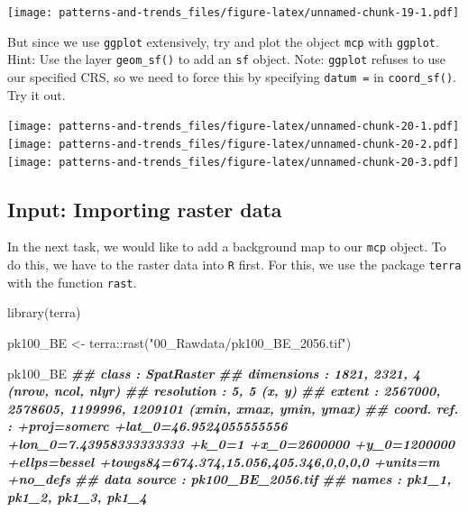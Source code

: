 \documentclass[
]{book}
\newenvironment{Shaded}{\begin{snugshade}}{\end{snugshade}}
\newcommand{\DocumentationTok}[1]{\textcolor[rgb]{0.56,0.35,0.01}{\textbf{\textit{#1}}}}
\newcommand{\FunctionTok}[1]{\textcolor[rgb]{0.00,0.00,0.00}{#1}}
\newcommand{\NormalTok}[1]{#1}
\newcommand{\OtherTok}[1]{\textcolor[rgb]{0.56,0.35,0.01}{#1}}
\newcommand{\SpecialCharTok}[1]{\textcolor[rgb]{0.00,0.00,0.00}{#1}}
\newcommand{\StringTok}[1]{\textcolor[rgb]{0.31,0.60,0.02}{#1}}
\begin{document}
\texttt{[image: patterns-and-trends\_files/figure-latex/unnamed-chunk-19-1.pdf]}

But since we use \texttt{ggplot} extensively, try and plot the object \texttt{mcp} with \texttt{ggplot}. Hint: Use the layer \texttt{geom\_sf()} to add an \texttt{sf} object.
Note: \texttt{ggplot} refuses to use our specified CRS, so we need to force this by specifying \texttt{datum\ =} in \texttt{coord\_sf()}. Try it out.

\texttt{[image: patterns-and-trends\_files/figure-latex/unnamed-chunk-20-1.pdf]} \texttt{[image: patterns-and-trends\_files/figure-latex/unnamed-chunk-20-2.pdf]} \texttt{[image: patterns-and-trends\_files/figure-latex/unnamed-chunk-20-3.pdf]}

\hypertarget{input-importing-raster-data}{%
\subsection{Input: Importing raster data}\label{input-importing-raster-data}}

In the next task, we would like to add a background map to our \texttt{mcp} object. To do this, we have to the raster data into \texttt{R} first. For this, we use the package \texttt{terra} with the function \texttt{rast}.

\begin{Shaded}
\begin{Highlighting}[]

\FunctionTok{library}\NormalTok{(terra)}

\NormalTok{pk100\_BE }\OtherTok{\textless{}{-}}\NormalTok{ terra}\SpecialCharTok{::}\FunctionTok{rast}\NormalTok{(}\StringTok{"00\_Rawdata/pk100\_BE\_2056.tif"}\NormalTok{)}

\NormalTok{pk100\_BE}
\DocumentationTok{\#\# class       : SpatRaster }
\DocumentationTok{\#\# dimensions  : 1821, 2321, 4  (nrow, ncol, nlyr)}
\DocumentationTok{\#\# resolution  : 5, 5  (x, y)}
\DocumentationTok{\#\# extent      : 2567000, 2578605, 1199996, 1209101  (xmin, xmax, ymin, ymax)}
\DocumentationTok{\#\# coord. ref. : +proj=somerc +lat\_0=46.9524055555556 +lon\_0=7.43958333333333 +k\_0=1 +x\_0=2600000 +y\_0=1200000 +ellps=bessel +towgs84=674.374,15.056,405.346,0,0,0,0 +units=m +no\_defs }
\DocumentationTok{\#\# data source : pk100\_BE\_2056.tif }
\DocumentationTok{\#\# names       : pk1\_1, pk1\_2, pk1\_3, pk1\_4}
\end{Highlighting}
\end{Shaded}
\end{document}
